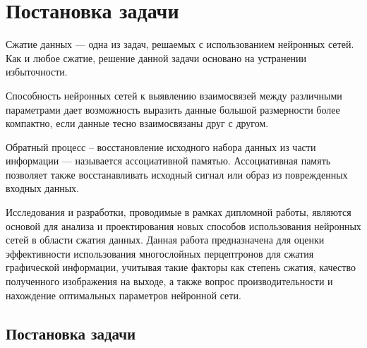 \section{Постановка задачи}
\label{sec:practice:planning}

Сжатие данных --- одна из задач, решаемых с использованием нейронных сетей.
Как и любое сжатие, решение данной задачи основано на устранении избыточности.

Способность нейронных сетей к выявлению взаимосвязей между различными параметрами дает возможность выразить данные большой размерности более компактно, если данные тесно взаимосвязаны друг с другом.

Обратный процесс – восстановление исходного набора данных из части информации --- называется ассоциативной памятью.
Ассоциативная память позволяет также восстанавливать исходный сигнал или образ из поврежденных входных данных.

Исследования и разработки, проводимые в рамках дипломной работы, являются основой для анализа и проектирования новых способов использования нейронных сетей в области сжатия данных.
Данная работа предназначена для оценки эффективности использования многослойных перцептронов для сжатия графической информации,
учитывая такие факторы как степень сжатия, качество полученного изображения на выходе,
а также вопрос производительности и нахождение оптимальных параметров нейронной сети.


\subsection{Постановка задачи}
\label{sub:practice:task_planning}


